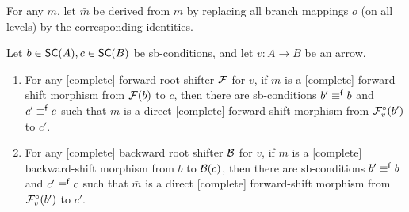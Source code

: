 \begin{lemma}
For any $m$, let $\bar m$ be derived from $m$ by replacing all branch mappings $o$ (on all levels) by the corresponding identities.

\smallskip
Let $b\in \SC A,c\in \SC B$ be sb-conditions, and let $v:A\to B$ be an arrow.
\begin{enumerate}[topsep=\smallskipamount]
\item For any [complete] forward root shifter $\mathcal{F}$ for $v$, if $m$ is a [complete] forward-shift morphism from $\mathcal{F}(b)$ to $c$, then there are sb-conditions $b'\equiv^{\mathsf f} b$ and $c'\equiv^{\mathsf f} c$ such that $\bar m$ is a direct [complete] forward-shift morphism from $\mathcal{F}^\circ_{v}(b')$ to $c'$.

\item For any [complete] backward root shifter $\mathcal{B}$ for $v$, if $m$ is a [complete] backward-shift morphism from $b$ to $\mathcal{B}(c)$, then there are sb-conditions $b'\equiv^{\mathsf f} b$ and $c'\equiv^{\mathsf f} c$ such that $\bar m$ is a direct [complete] forward-shift morphism from $\mathcal{F}^\circ_{v}(b')$ to $c'$.
\end{enumerate}
\end{lemma}
%
